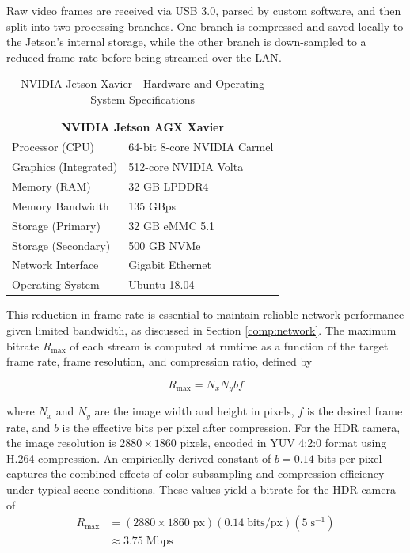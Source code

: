 \documentclass[../main.tex]{subfiles}
\begin{document}
Raw video frames are received via USB 3.0, parsed by custom software, and then split into two processing branches. 
One branch is compressed and saved locally to the Jetson's internal storage, while the other branch is down-sampled to a reduced frame rate before being streamed over the \ac{LAN}.%





\begin{table}[htpb]
\centering
\begin{tabular}{ll}
\hline
\multicolumn{2}{c}{NVIDIA Jetson AGX Xavier} \\
\hline
\hline
Processor (CPU) & 64-bit 8-core NVIDIA Carmel \\
Graphics (Integrated) & 512-core NVIDIA Volta \\
Memory (RAM) & 32 GB LPDDR4 \\
Memory Bandwidth & 135 GBps \\
Storage (Primary) & 32 GB eMMC 5.1 \\
Storage (Secondary) & 500 GB NVMe \\
Network Interface & Gigabit Ethernet \\
Operating System & Ubuntu 18.04 \\
\hline
\end{tabular}
\caption{NVIDIA Jetson Xavier - Hardware and Operating System Specifications}
\label{table:Xavier_hardware}
\end{table}

This reduction in frame rate is essential to maintain reliable network performance given limited bandwidth, as discussed in Section \ref{comp:network}. 
The maximum bitrate $R_{\text{max}}$ of each stream is computed at runtime as a function of the target frame rate, frame resolution, and compression ratio, defined by

\begin{equation}
    R_{\text{max}} = N_x N_y b f
\end{equation}

where $N_x$ and $N_y$ are the image width and height in pixels, $f$ is the desired frame rate, and $b$ is the effective bits per pixel after compression.
For the HDR camera, the image resolution is $2880 \times 1860$ pixels, encoded in YUV 4:2:0 format using H.264 compression.
An empirically derived constant of $b = 0.14$ bits per pixel captures the combined effects of color subsampling and compression efficiency under typical scene conditions.
These values yield a bitrate for the HDR camera of
\begin{equation*}
    \begin{split}
        R_{\text{max}} & = (2880 \times 1860\; \text{px}) (0.14 \;\text{bits/px})(5\;\text{s}^{-1})  \\
        & \approx 3.75\; \text{Mbps}
    \end{split}
\end{equation*}
\end{document}
